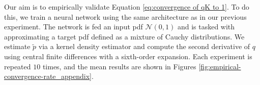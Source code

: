\documentclass{article}
\newcommand{\normdist}[2]{\mathcal{N}(#1, #2)}
\begin{document}
Our aim is to empirically validate Equation \ref{eq:convergence of qK to 1}. To do this, we train a neural network using the same architecture as in our previous experiment. The network is fed an input pdf \(\normdist{0}{1}\) and is tasked with approximating a target pdf defined as a mixture of Cauchy distributions. We estimate \(\tilde{p}\) via a kernel density estimator and compute the second derivative of \(q\) using central finite differences with a sixth-order expansion. Each experiment is repeated $10$ times, and the mean results are shown in Figures \ref{fig:empirical-convergence-rate_appendix}.

\end{document}
